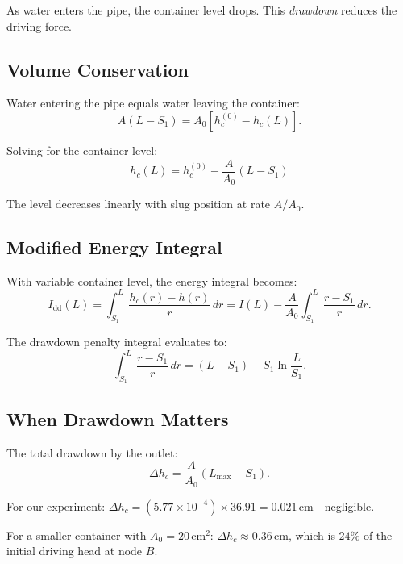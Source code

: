 \documentclass[11pt,a4paper]{article}
\theoremstyle{definition}
\begin{document}
As water enters the pipe, the container level drops. This \emph{drawdown} reduces the driving force.

\subsection{Volume Conservation}

Water entering the pipe equals water leaving the container:
\begin{equation}
  A(L - S_1) = A_0[h_c^{(0)} - h_c(L)].
  \label{eq:volume-conservation}
\end{equation}

Solving for the container level:
\begin{equation}
  \boxed{h_c(L) = h_c^{(0)} - \frac{A}{A_0}(L - S_1)}
  \label{eq:drawdown}
\end{equation}

The level decreases linearly with slug position at rate $A/A_0$.

\subsection{Modified Energy Integral}

With variable container level, the energy integral becomes:
\begin{equation}
  I_{\text{dd}}(L) = \int_{S_1}^{L} \frac{h_c(r) - h(r)}{r}\,dr = I(L) - \frac{A}{A_0}\int_{S_1}^{L}\frac{r - S_1}{r}\,dr.
  \label{eq:I-dd}
\end{equation}

The drawdown penalty integral evaluates to:
\begin{equation}
  \int_{S_1}^{L}\frac{r - S_1}{r}\,dr = (L - S_1) - S_1\ln\frac{L}{S_1}.
  \label{eq:drawdown-penalty}
\end{equation}

\subsection{When Drawdown Matters}

The total drawdown by the outlet:
\begin{equation}
  \Delta h_c = \frac{A}{A_0}(L_{\max} - S_1).
  \label{eq:total-drawdown}
\end{equation}

For our experiment: $\Delta h_c = (5.77 \times 10^{-4}) \times 36.91 = 0.021$\,cm---negligible.

For a smaller container with $A_0 = 20\,\text{cm}^2$: $\Delta h_c \approx 0.36$\,cm, which is $24\%$ of the initial driving head at node $B$.
\end{document}
